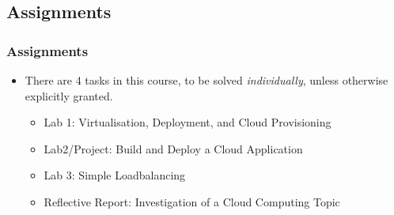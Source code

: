 \documentclass[10pt]{beamer}
\begin{document}



\subsection{Assignments}
\begin{frame}[t]
\frametitle{Assignments}
\begin{itemize}
\item There are 4 tasks in this course, to be solved \emph{individually}, unless otherwise explicitly granted.
\begin{itemize}
\item Lab 1: Virtualisation, Deployment, and Cloud Provisioning
\item Lab2/Project: Build and Deploy a Cloud Application
\item Lab 3: Simple Loadbalancing
\item Reflective Report: Investigation of a Cloud Computing Topic
\end{itemize}
\end{itemize}
\end{frame}
\end{document}
